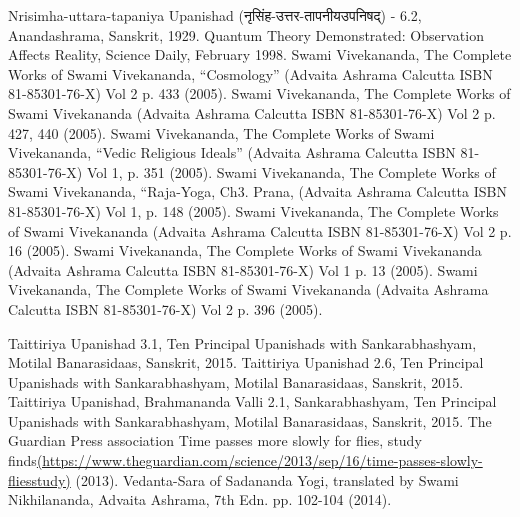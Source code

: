 \documentclass[twoside, 13pt]{article}
\begin{document}
{{{\begin{thebibliography}{99}
\bibitem{} Nrisimha-uttara-tapaniya Upanishad (\foreignlanguage{hindi}{{\fontsize{9}{11}\selectfont नृसिंह-उत्तर-तापनीयउपनिषद्}}) - 6.2, Anandashrama, Sanskrit, 1929.
\bibitem{} Quantum Theory Demonstrated: Observation Affects Reality, Science Daily, February 1998.
\bibitem{} Swami Vivekananda, The Complete Works of Swami Vivekananda, “Cosmology” (Advaita Ashrama Calcutta ISBN 81-85301-76-X) Vol 2 p. 433 (2005).
\bibitem{} Swami Vivekananda, The Complete Works of Swami Vivekananda (Advaita Ashrama Calcutta ISBN 81-85301-76-X) Vol 2 p. 427, 440 (2005).
\bibitem{} Swami Vivekananda, The Complete Works of Swami Vivekananda, “Vedic Religious Ideals” (Advaita Ashrama Calcutta ISBN 81-85301-76-X) Vol 1, p. 351 (2005).
\bibitem{} Swami Vivekananda, The Complete Works of Swami Vivekananda, “Raja-Yoga, Ch3. Prana, (Advaita Ashrama Calcutta ISBN 81-85301-76-X) Vol 1, p. 148 (2005).
\bibitem{} Swami Vivekananda, The Complete Works of Swami Vivekananda (Advaita Ashrama Calcutta ISBN 81-85301-76-X) Vol 2 p. 16 (2005).
\bibitem{} Swami Vivekananda, The Complete Works of Swami Vivekananda (Advaita Ashrama Calcutta ISBN 81-85301-76-X) Vol 1 p. 13 (2005).
\bibitem{} Swami Vivekananda, The Complete Works of Swami Vivekananda (Advaita Ashrama Calcutta ISBN 81-85301-76-X) Vol 2 p. 396 (2005).

\bibitem{} Taittiriya Upanishad 3.1, Ten Principal Upanishads with Sankarabhashyam, Motilal Banarasidaas, Sanskrit, 2015. 
\bibitem{} Taittiriya Upanishad 2.6, Ten Principal Upanishads with Sankarabhashyam, Motilal Banarasidaas, Sanskrit, 2015.
\bibitem{} Taittiriya Upanishad, Brahmananda Valli 2.1, Sankarabhashyam, Ten Principal Upanishads with Sankarabhashyam, Motilal Banarasidaas, Sanskrit, 2015.
\bibitem{} The Guardian Press association Time passes more slowly for ﬂies, study ﬁnds\break \url{(https://www.theguardian.com/science/2013/sep/16/time-passes-slowly-ﬂiesstudy)} (2013).
\bibitem{} Vedanta-Sara of Sadananda Yogi, translated by Swami Nikhilananda, Advaita Ashrama, 7th Edn. pp. 102-104 (2014).




\end{thebibliography}}}}
\end{document}
